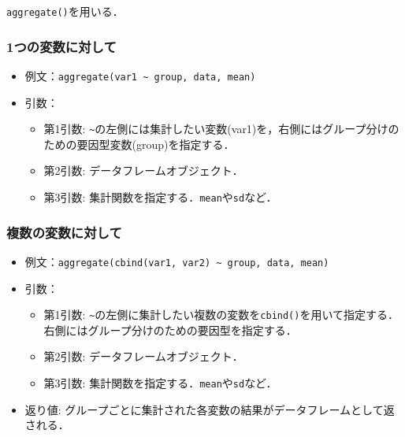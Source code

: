 \documentclass[
  xelatex, ja=standard]{bxjsarticle}
\providecommand{\tightlist}{%
  \setlength{\itemsep}{0pt}\setlength{\parskip}{0pt}}
\begin{document}
\texttt{aggregate()}を用いる．

\subsubsection{1つの変数に対して}\label{ux3064ux306eux5909ux6570ux306bux5bfeux3057ux3066}

\begin{itemize}
\tightlist
\item
  例文：\texttt{aggregate(var1\ \textasciitilde{}\ group,\ data,\ mean)}
\item
  引数：

  \begin{itemize}
  \tightlist
  \item
    第1引数:
    \texttt{\textasciitilde{}}の左側には集計したい変数(var1)を，右側にはグループ分けのための要因型変数(group)を指定する．
  \item
    第2引数: データフレームオブジェクト．
  \item
    第3引数: 集計関数を指定する．\texttt{mean}や\texttt{sd}など．
  \end{itemize}
\end{itemize}

\subsubsection{複数の変数に対して}\label{ux8907ux6570ux306eux5909ux6570ux306bux5bfeux3057ux3066}

\begin{itemize}
\tightlist
\item
  例文：\texttt{aggregate(cbind(var1,\ var2)\ \textasciitilde{}\ group,\ data,\ mean)}
\item
  引数：

  \begin{itemize}
  \tightlist
  \item
    第1引数:
    \texttt{\textasciitilde{}}の左側に集計したい複数の変数を\texttt{cbind()}を用いて指定する．右側にはグループ分けのための要因型を指定する．
  \item
    第2引数: データフレームオブジェクト．
  \item
    第3引数: 集計関数を指定する．\texttt{mean}や\texttt{sd}など．
  \end{itemize}
\item
  返り値:
  グループごとに集計された各変数の結果がデータフレームとして返される．
\end{itemize}
\end{document}
